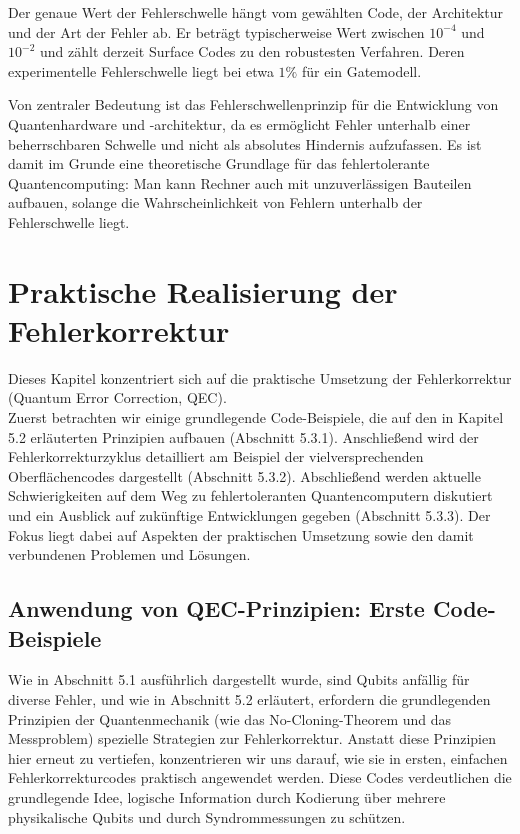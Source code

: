 Der genaue Wert der Fehlerschwelle hängt vom gewählten Code, der Architektur und der Art der Fehler ab. Er beträgt typischerweise  Wert zwischen \(
    10^{-4}
\)  und \(
    10^{-2}
\) und zählt derzeit Surface Codes zu den robustesten Verfahren. Deren experimentelle Fehlerschwelle liegt bei etwa \(1 \%\) für 
ein Gatemodell. \cite{Fowler et al.}

Von zentraler Bedeutung ist das Fehlerschwellenprinzip für die Entwicklung von Quantenhardware und -architektur, da es ermöglicht Fehler unterhalb einer beherrschbaren Schwelle und nicht als absolutes Hindernis aufzufassen. Es ist damit im Grunde eine theoretische Grundlage für das fehlertolerante Quantencomputing: Man kann Rechner auch mit unzuverlässigen Bauteilen aufbauen, solange die Wahrscheinlichkeit von Fehlern unterhalb der Fehlerschwelle liegt.

\section{Praktische Realisierung der Fehlerkorrektur}\label{chap:QEC3}

Dieses Kapitel konzentriert sich auf die praktische Umsetzung der Fehlerkorrektur (Quantum Error Correction, QEC).\\
Zuerst betrachten wir einige grundlegende Code-Beispiele, die auf den in Kapitel 5.2 erläuterten Prinzipien aufbauen (Abschnitt 5.3.1). Anschließend wird der Fehlerkorrekturzyklus detailliert am Beispiel der vielversprechenden Oberflächencodes dargestellt (Abschnitt 5.3.2). Abschließend werden aktuelle Schwierigkeiten auf dem Weg zu fehlertoleranten Quantencomputern diskutiert und ein Ausblick auf zukünftige Entwicklungen gegeben (Abschnitt 5.3.3). Der Fokus liegt dabei auf Aspekten der praktischen Umsetzung sowie den damit verbundenen Problemen und Lösungen.

\subsection{Anwendung von QEC-Prinzipien: Erste Code-Beispiele}

Wie in Abschnitt 5.1 ausführlich dargestellt wurde, sind Qubits anfällig für diverse Fehler, und wie in Abschnitt 5.2 erläutert, erfordern die grundlegenden Prinzipien der Quantenmechanik (wie das No-Cloning-Theorem und das Messproblem) spezielle Strategien zur Fehlerkorrektur. Anstatt diese Prinzipien hier erneut zu vertiefen, konzentrieren wir uns darauf, wie sie in ersten, einfachen Fehlerkorrekturcodes praktisch angewendet werden. Diese Codes verdeutlichen die grundlegende Idee, logische Information durch Kodierung über mehrere physikalische Qubits und durch Syndrommessungen zu schützen.

